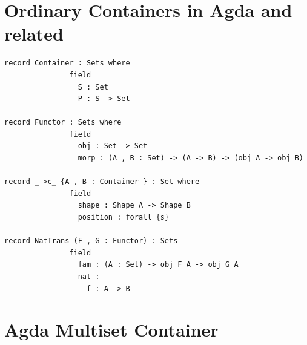 \documentclass[12pt]{report}
\begin{document}
\section{Ordinary Containers in Agda and related}
\begin{verbatim}
record Container : Sets where
               field
                 S : Set
                 P : S -> Set
                 
record Functor : Sets where
               field
                 obj : Set -> Set
                 morp : (A , B : Set) -> (A -> B) -> (obj A -> obj B)                 

record _->c_ {A , B : Container } : Set where
               field
                 shape : Shape A -> Shape B
                 position : forall {s} 
                 
record NatTrans (F , G : Functor) : Sets
               field
                 fam : (A : Set) -> obj F A -> obj G A 
                 nat : 
                   f : A -> B                 

\end{verbatim}
\section{Agda Multiset Container}
\end{document}
